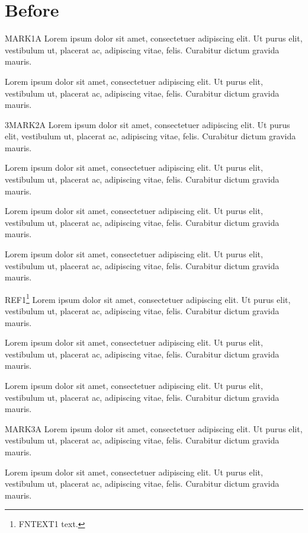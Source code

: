 \documentclass[twocolumn]{article}
\begin{document}
\section{Before}MARK1A Lorem ipsum dolor sit amet, consectetuer adipiscing elit. Ut purus elit, vestibulum ut, placerat ac, adipiscing vitae, felis. Curabitur dictum gravida mauris.\par Lorem ipsum dolor sit amet, consectetuer adipiscing elit. Ut purus elit, vestibulum ut, placerat ac, adipiscing vitae, felis. Curabitur dictum gravida mauris.\par 
\begin{multicols}{3}MARK2A Lorem ipsum dolor sit amet, consectetuer adipiscing elit. Ut purus elit, vestibulum ut, placerat ac, adipiscing vitae, felis. Curabitur dictum gravida mauris.\par Lorem ipsum dolor sit amet, consectetuer adipiscing elit. Ut purus elit, vestibulum ut, placerat ac, adipiscing vitae, felis. Curabitur dictum gravida mauris.\par Lorem ipsum dolor sit amet, consectetuer adipiscing elit. Ut purus elit, vestibulum ut, placerat ac, adipiscing vitae, felis. Curabitur dictum gravida mauris.\par Lorem ipsum dolor sit amet, consectetuer adipiscing elit. Ut purus elit, vestibulum ut, placerat ac, adipiscing vitae, felis. Curabitur dictum gravida mauris.\par REF1\footnote{FNTEXT1 text.} Lorem ipsum dolor sit amet, consectetuer adipiscing elit. Ut purus elit, vestibulum ut, placerat ac, adipiscing vitae, felis. Curabitur dictum gravida mauris.\par Lorem ipsum dolor sit amet, consectetuer adipiscing elit. Ut purus elit, vestibulum ut, placerat ac, adipiscing vitae, felis. Curabitur dictum gravida mauris.\par Lorem ipsum dolor sit amet, consectetuer adipiscing elit. Ut purus elit, vestibulum ut, placerat ac, adipiscing vitae, felis. Curabitur dictum gravida mauris.\par \end{multicols}
MARK3A Lorem ipsum dolor sit amet, consectetuer adipiscing elit. Ut purus elit, vestibulum ut, placerat ac, adipiscing vitae, felis. Curabitur dictum gravida mauris.\par Lorem ipsum dolor sit amet, consectetuer adipiscing elit. Ut purus elit, vestibulum ut, placerat ac, adipiscing vitae, felis. Curabitur dictum gravida mauris.\par 
\end{document}
